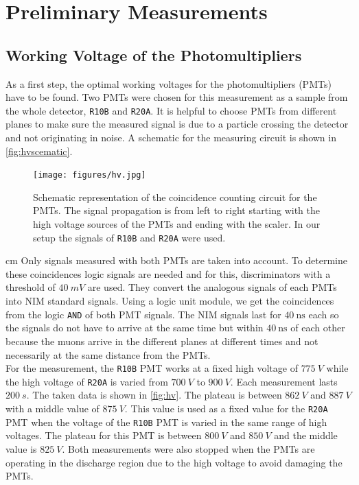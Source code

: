 \chapter{Preliminary Measurements}
\label{sec:prem}
\section{Working Voltage of the Photomultipliers}
As a first step, the optimal working voltages for the photomultipliers (PMTs) have to be found.
Two PMTs were chosen for this measurement as a sample from the whole detector, \texttt{R10B} and \texttt{R20A}.
It is helpful to choose PMTs from different planes to make sure the measured signal is due to a 
particle crossing the detector and not originating in noise.
A schematic for the measuring circuit is shown in \autoref{fig:hvscematic}.\\
\begin{figure}
    \centering 
    \texttt{[image: figures/hv.jpg]}
    \caption{Schematic representation of the coincidence counting circuit for the PMTs. 
    The signal propagation is from left to right starting with the high voltage sources of the PMTs and ending with the scaler. In our setup the signals of \texttt{R10B} and \texttt{R20A} were used.}
    \label{fig:hvscematic}
\end{figure}

 cm
Only signals measured with both PMTs are taken into account. To determine these coincidences 
logic signals are needed and for this, discriminators with a threshold of $\SI{40}{mV}$ are used. 
They convert the analogous signals of each PMTs into NIM standard signals. Using a logic unit module, we get
the coincidences from the logic \texttt{AND} of both PMT signals. The NIM signals 
last for $\SI{40}{\ns}$ each so the signals do not have to arrive at the same time but within 
$\SI{40}{\ns}$ of each other because the muons arrive in the different planes at different times 
and not necessarily at the same distance from the PMTs.\\

For the measurement, the \texttt{R10B} PMT works at a fixed high voltage of $\SI{775}{V}$ while the high voltage of 
\texttt{R20A} is varied from $\SI{700}{V}$ to $\SI{900}{V}$. Each measurement lasts $\SI{200}{s}$.
The taken data is shown in \autoref{fig:hv}. The plateau is between $\SI{862}{V}$ 
and $\SI{887}{V}$ with a
middle value of $\SI{875}{V}$. This value is used as a fixed value for the \texttt{R20A} PMT when the voltage of the \texttt{R10B}
PMT is varied in the same range of high voltages. The plateau for this PMT is between $\SI{800}{V}$ and $\SI{850}{V}$
and the middle value is $\SI{825}{V}$.
Both measurements were also stopped when the PMTs are operating in the discharge region due to the high voltage to avoid damaging the PMTs.\\

